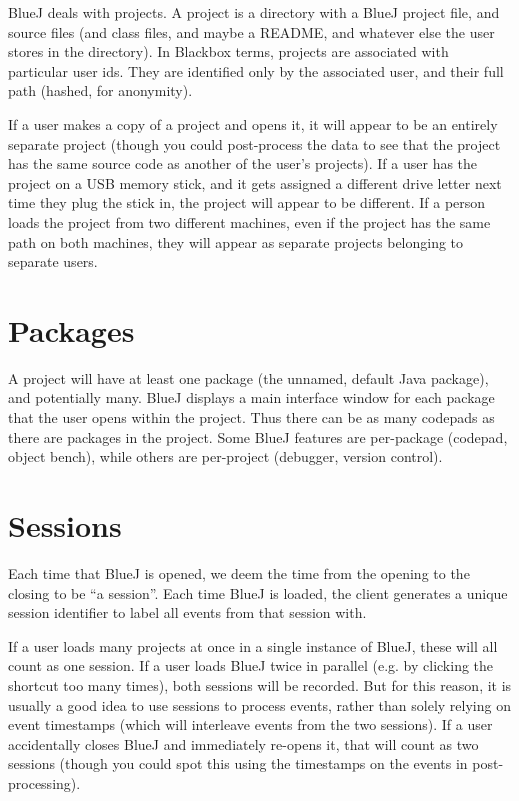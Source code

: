 \documentclass{book}
\begin{document}
BlueJ deals with projects.  A project is a directory with a BlueJ project
file, and source files (and class files, and maybe a README, and whatever else
the user stores in the directory).  In Blackbox terms, projects are associated
with particular user ids.  They are identified only by the associated user,
and their full path (hashed, for anonymity).

If a user makes a copy of a project and opens it, it will appear to be an
entirely separate project (though you could post-process the data to see that
the project has the same source code as another of the user's projects).  If a
user has the project on a USB memory stick, and it gets assigned a different
drive letter next time they plug the stick in, the project will appear to be
different.  If a person loads the project from two different machines, even if
the project has the same path on both machines, they will appear as separate
projects belonging to separate users.

\section{Packages}

A project will have at least one package (the unnamed, default Java package),
and potentially many.  BlueJ displays a main interface window for each package
that the user opens within the project.  Thus there can be as many codepads as
there are packages in the project.  Some BlueJ features are per-package (codepad,
object bench), while others are per-project (debugger, version control).

\section{Sessions}
\label{def:sequence_id}

Each time that BlueJ is opened, we deem the time from the opening to the
closing to be ``a session''.  Each time BlueJ is loaded, the client generates
a unique session identifier to label all events from that session with.

If a user loads many projects at once in a single instance of BlueJ, these
will all count as one session.  If a user loads BlueJ twice in parallel
(e.g. by clicking the shortcut too many times), both sessions will be
recorded.  But for this reason, it is usually a good idea to use sessions to
process events, rather than solely relying on event timestamps (which will
interleave events from the two sessions).  If a user accidentally closes BlueJ
and immediately re-opens it, that will count as two sessions (though you could
spot this using the timestamps on the events in post-processing).
\end{document}
